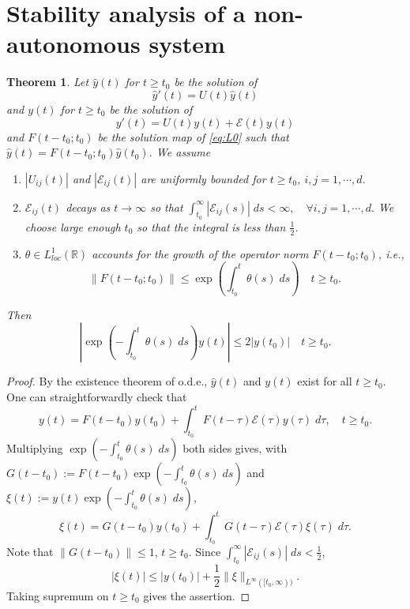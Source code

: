 \documentclass[a4paper,11pt]{article}
\newtheorem{theorem}{Theorem}
\theoremstyle{remark}
\begin{document}
\section{Stability analysis of a non-autonomous system}

\begin{theorem} \label{prop:stab}
Let $\hat{y}(t)$ for $t\ge t_0$ be the solution of
\begin{equation}\label{eq:L0}
  \hat{y}'(t) = U(t)\hat{y}(t)
\end{equation} 
and $y(t)$ for $t\ge t_0$ be the solution of
\begin{equation}\label{eq:L1}
  y'(t) = U(t)y(t) + \mathcal{E}(t)y(t)
\end{equation} 
and $F(t-t_0;t_0)$ be the solution map of \eqref{eq:L0} such that $\hat{y}(t) = F(t-t_0;t_0)\hat{y}(t_0)$. We assume
\begin{enumerate}
   \item $|U_{ij}(t)|$ and $|\mathcal{E}_{ij}(t)|$ are uniformly bounded for $t\ge t_0$, $i,j=1,\cdots,d$.
   \item $\mathcal{E}_{ij}(t)$ decays as $t \rightarrow \infty$ so that %
 $ \int_{t_0}^\infty |\mathcal{E}_{ij}(s)| \; ds < \infty, \quad \forall i,j=1,\cdots,d.$
 We choose large enough $t_0$ so that the integral is less than $\frac{1}{2}$.
   \item $\theta\in L^1_{loc}( \mathbb{R})$ accounts for the growth of the operator norm $F(t-t_0;t_0)$, i.e.,
 $$\big\|F(t-t_0;t_0)\big\| \le \exp\left(\int_{t_0}^t \theta(s)\; ds\right) \quad t\ge t_0.$$  
\end{enumerate}
Then 
$$\left|\exp\left(-\int_{t_0}^t \theta(s)\; ds\right)y(t)\right| \le 2|y(t_0)| \quad t\ge t_0.$$
\end{theorem}
\begin{proof}
By the existence theorem of o.d.e., $\hat{y}(t)$ and $y(t)$ exist for all $t\ge t_0$. One can straightforwardly check that
\begin{equation}\label{eq:integral}
y(t) = F(t-t_0)y(t_0) + \int_{t_0}^t F(t-\tau) \mathcal{E}(\tau)y(\tau) \; d\tau, \quad t\ge t_0.
\end{equation} 
Multiplying $\exp\left(-\int_{t_0}^t \theta(s)\; ds\right)$ both sides gives, with $G(t-t_0):=F(t-t_0)\exp\left(-\int_{t_0}^t \theta(s)\; ds\right)$ and $\xi(t):=y(t)\exp\left(-\int_{t_0}^t \theta(s)\; ds\right)$,
$$ \xi(t) = G(t-t_0)y(t_0) + \int_{t_0}^t G(t-\tau)\mathcal{E}(\tau)\xi(\tau) \; d\tau.$$
Note that $\|G(t-t_0)\|\le 1$, $t\ge t_0$.
Since $\int_{t_0}^\infty |\mathcal{E}_{ij}(s)| \; ds < \frac{1}{2}$, 
$$ |\xi(t)| \le |y(t_0)| + \frac{1}{2}\|\xi\|_{L^\infty([t_0,\infty))}.$$
Taking supremum on $t\ge t_0$ gives the assertion.
\end{proof}
\end{document}
